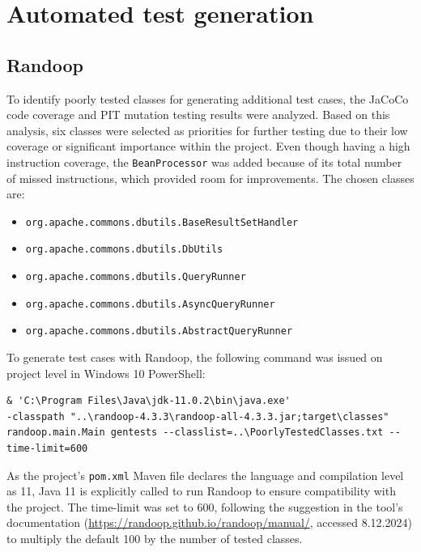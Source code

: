\documentclass[sigconf]{acmart}
\begin{document}
\section{Automated test generation}
\subsection*{Randoop}

To identify poorly tested classes for generating additional test cases, the JaCoCo code coverage and PIT mutation testing results were analyzed. Based on this analysis, six classes were selected as priorities for further testing due to their low coverage or significant importance within the project. Even though having a high instruction coverage, the \texttt{BeanProcessor} was added because of its total number of missed instructions, which provided room for improvements. The chosen classes are:

\begin{itemize}
    \item \texttt{org.apache.commons.dbutils.BaseResultSetHandler}
    \item \texttt{org.apache.commons.dbutils.DbUtils}
    \item \texttt{org.apache.commons.dbutils.QueryRunner}
    \item \texttt{org.apache.commons.dbutils.AsyncQueryRunner}
    \item \texttt{org.apache.commons.dbutils.AbstractQueryRunner}
\end{itemize}

To generate test cases with Randoop, the following command was issued on project level in Windows 10 PowerShell:

\begin{lstlisting}
& 'C:\Program Files\Java\jdk-11.0.2\bin\java.exe' 
-classpath "..\randoop-4.3.3\randoop-all-4.3.3.jar;target\classes" 
randoop.main.Main gentests --classlist=..\PoorlyTestedClasses.txt --time-limit=600
\end{lstlisting}

As the project’s \texttt{pom.xml} Maven file declares the language and compilation level as 11, Java 11 is explicitly called to run Randoop to ensure compatibility with the project. The time-limit was set to 600, following the suggestion in the tool’s documentation (\href{https://randoop.github.io/randoop/manual/}{https://randoop.github.io/randoop/manual/}, accessed 8.12.2024) to multiply the default 100 by the number of tested classes.
\end{document}
